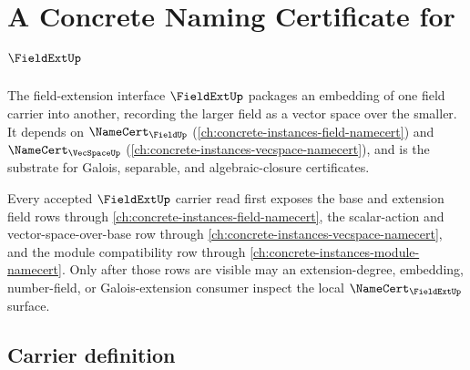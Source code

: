 \chapter{A Concrete Naming Certificate for $\FieldExtUp$}
\label{ch:concrete-instances-fieldext-namecert}

The field-extension interface $\FieldExtUp$ packages an embedding of one field carrier into another, recording the larger field as a vector space over the smaller. It depends on $\NameCert_{\FieldUp}$ (\autoref{ch:concrete-instances-field-namecert}) and $\NameCert_{\VecSpaceUp}$ (\autoref{ch:concrete-instances-vecspace-namecert}), and is the substrate for Galois, separable, and algebraic-closure certificates.

Every accepted $\FieldExtUp$ carrier read first exposes the base and extension field rows through \autoref{ch:concrete-instances-field-namecert}, the scalar-action and vector-space-over-base row through \autoref{ch:concrete-instances-vecspace-namecert}, and the module compatibility row through \autoref{ch:concrete-instances-module-namecert}. Only after those rows are visible may an extension-degree, embedding, number-field, or Galois-extension consumer inspect the local $\NameCert_{\FieldExtUp}$ surface.

\section{Carrier definition}
\label{sec:fieldext-carrier}

